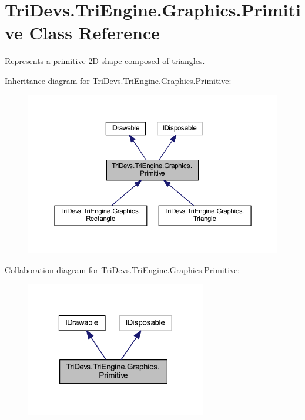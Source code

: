 \hypertarget{class_tri_devs_1_1_tri_engine_1_1_graphics_1_1_primitive}{\section{Tri\-Devs.\-Tri\-Engine.\-Graphics.\-Primitive Class Reference}
\label{class_tri_devs_1_1_tri_engine_1_1_graphics_1_1_primitive}
}


Represents a primitive 2\-D shape composed of triangles.  




Inheritance diagram for Tri\-Devs.\-Tri\-Engine.\-Graphics.\-Primitive\-:
\nopagebreak
\begin{figure}[H]
\begin{center}
\leavevmode
\includegraphics[width=350pt]{class_tri_devs_1_1_tri_engine_1_1_graphics_1_1_primitive__inherit__graph}
\end{center}
\end{figure}


Collaboration diagram for Tri\-Devs.\-Tri\-Engine.\-Graphics.\-Primitive\-:
\nopagebreak
\begin{figure}[H]
\begin{center}
\leavevmode
\includegraphics[width=223pt]{class_tri_devs_1_1_tri_engine_1_1_graphics_1_1_primitive__coll__graph}
\end{center}
\end{figure}
